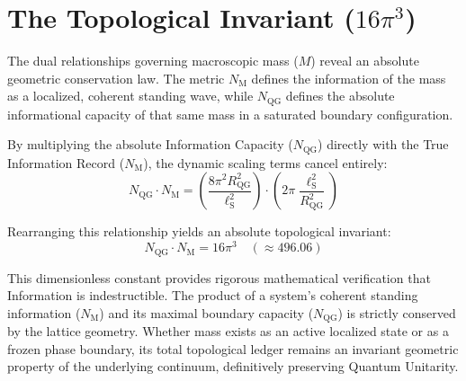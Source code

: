 \section{The Topological Invariant ($16\pi^3$)}

The dual relationships governing macroscopic mass ($M$) reveal an absolute geometric conservation law. The metric $N_{\mathrm{M}}$ defines the information of the mass as a localized, coherent standing wave, while $N_{\mathrm{QG}}$ defines the absolute informational capacity of that same mass in a saturated boundary configuration.

By multiplying the absolute Information Capacity ($N_{\mathrm{QG}}$) directly with the True Information Record ($N_{\mathrm{M}}$), the dynamic scaling terms cancel entirely:
\begin{equation}
    N_{\mathrm{QG}} \cdot N_{\mathrm{M}} = \left( \frac{8\pi^2 R_{\mathrm{QG}}^2}{\ell_{\mathrm{S}}^2} \right) \cdot \left( 2\pi \frac{\ell_{\mathrm{S}}^2}{R_{\mathrm{QG}}^2} \right)
\end{equation}

Rearranging this relationship yields an absolute topological invariant:
\begin{equation}
    N_{\mathrm{QG}} \cdot N_{\mathrm{M}} = 16\pi^3 \quad (\approx 496.06)
\end{equation}

This dimensionless constant provides rigorous mathematical verification that Information is indestructible. The product of a system's coherent standing information ($N_{\mathrm{M}}$) and its maximal boundary capacity ($N_{\mathrm{QG}}$) is strictly conserved by the lattice geometry. Whether mass exists as an active localized state or as a frozen phase boundary, its total topological ledger remains an invariant geometric property of the underlying continuum, definitively preserving Quantum Unitarity.